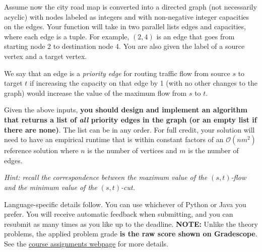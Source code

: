 \documentclass[11pt]{article}
\begin{document}
Assume now the city road map is converted into a directed graph (not necessarily acyclic) with nodes labeled as integers and with non-negative integer capacities on the edges. Your function will take in two parallel lists edges and capacities, where each edge is a tuple. For example, $(2, 4)$ is an edge that goes from starting node 2 to destination node 4. You are also given the label of a source vertex and a target vertex.

We say that an edge is a \textit{priority edge} for routing traffic flow from source $s$ to target $t$ if increasing the capacity on that edge by 1 (with no other changes to the graph) would increase the value of the maximum flow from $s$ to $t$. 

Given the above inputs, \textbf{you should design and implement an algorithm that returns a list of \textit{all} priority edges in the graph (or an empty list if there are none)}. The list can be in any order. For full credit, your solution will need to have an empirical runtime that is within constant factors of an $\mathcal{O}(nm^2)$ reference solution where $n$ is the number of vertices and $m$ is the number of edges. 

\textit{Hint: recall the correspondence between the maximum value of the $(s,t)$-flow and the minimum value of the $(s,t)$-cut.}

Language-specific details follow. You can use whichever of Python or Java you prefer. You will receive automatic feedback when submitting, and you can resubmit as many times as you like up to the deadline. \textbf{NOTE:} Unlike the theory problems, the applied problem grade \textbf{is the raw score shown on Gradescope}. See the \href{https://sites.duke.edu/spring24compsci330/assignments/}{course assignments webpage} for more details. 
\end{document}
